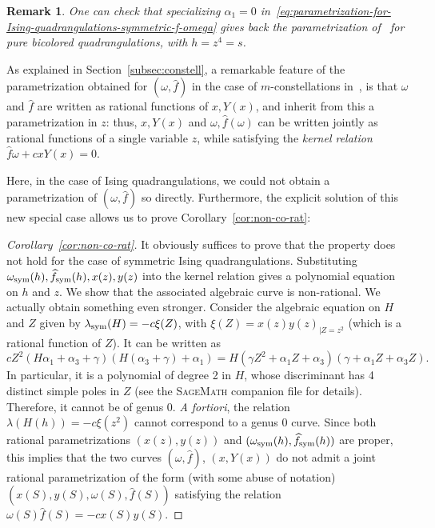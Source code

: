 \documentclass{scrartcl}
\newcommand\wh[1]{\widehat{#1}}
\newtheorem{rem}{Remark}[section]
\begin{document}
\begin{rem}
One can check that specializing $\alpha_1 = 0$ in~\eqref{eq:parametrization-for-Ising-quadrangulations-symmetric-f-omega} gives back the parametrization of~\cite{bouttier-carrance} for pure bicolored quadrangulations, with $h = z^4 = s$.
\end{rem}

As explained in Section~\ref{subsec:constell}, a remarkable feature of the parametrization obtained for $(\omega,\widehat{f})$ in the case of $m$-constellations in~\cite{bouttier-carrance}, is that $\omega$ and $\widehat{f}$ are written as rational functions of $x,Y(x)$, and inherit from this a parametrization in $z$: thus, $x,Y(x)$ and $\omega,\widehat{f}(\omega)$ can be written jointly as rational functions of a single variable $z$, while satisfying the \emph{kernel relation} $\widehat{f}\omega+cxY(x)=0$. 

Here, in the case of Ising quadrangulations, we could not obtain a parametrization of $(\omega,\widehat{f})$ so directly. Furthermore, the explicit solution of this new special case allows us to prove Corollary~\ref{cor:non-co-rat}:

\begin{proof}[Corollary~\ref{cor:non-co-rat}]
It obviously suffices to prove that the property does not hold for the case of symmetric Ising quadrangulations. Substituting $\omega_\textnormal{sym}(h),\widehat{f}_\textnormal{sym}(h), x(z),y(z)$ into the kernel relation gives a polynomial equation on $h$ and $z$. We show that the associated algebraic curve is non-rational. We actually obtain something even stronger. Consider the algebraic equation on $H$ and $Z$ given by $\lambda_{\textnormal{sym}}(H)=-c\xi(Z)$, with $\xi(Z)=x(z)y(z)_{|Z=z^2}$ (which is a rational function of $Z$). It can be written as
\[
cZ^2\left(H\alpha_1+\alpha_3+\gamma\right)\left(H(\alpha_3+\gamma)+\alpha_1\right)=H\left(\gamma Z^2+\alpha_1Z+\alpha_3\right)\left(\gamma+\alpha_1Z+\alpha_3Z\right).
\]
In particular, it is  a polynomial of degree 2 in $H$, whose discriminant has 4 distinct simple poles in $Z$ (see the \textsc{SageMath} companion file for details). Therefore, it cannot be of genus 0. \emph{A fortiori}, the relation $\lambda(H(h))=-c\xi(z^2)$ cannot correspond to a genus 0 curve. Since both rational parametrizations $(x(z),y(z))$ and $(\omega_{\textnormal{sym}}(h),\wh{f}_{\textnormal{sym}}(h))$ are proper, this implies that the two curves $(\omega,\wh{f})$, $(x,Y(x))$ do not admit a joint rational parametrization of the form (with some abuse of notation) $(x(S),y(S),\omega(S),\wh{f}(S))$ satisfying the relation $\omega(S)\wh{f}(S)=-cx(S)y(S)$. 
\end{proof}
\end{document}

